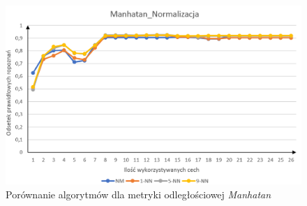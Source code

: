\documentclass[12pt]{article}
\begin{document}
\begin{figure}[H]
	\centering
		\includegraphics[scale=0.66]{images/algorithms/manhatan_norm.png}
	\caption{Porównanie algorytmów dla metryki odległościowej \textit{Manhatan}}
\end{figure}
\end{document}
